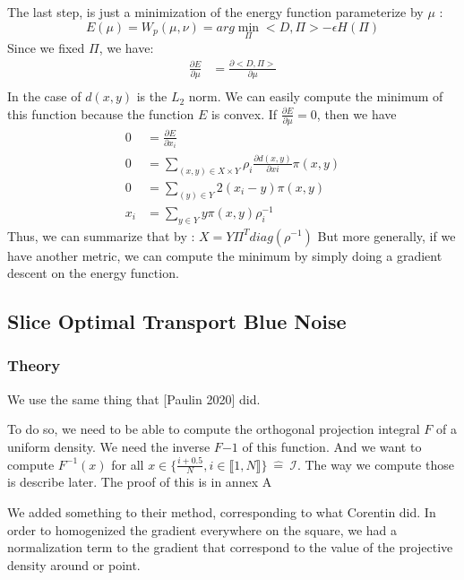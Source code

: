 \documentclass{classeENS}
\begin{document}
The last step, is just a minimization of the energy function parameterize by $\mu$ :
\[ E(\mu) = W_p(\mu, \nu) = arg \min_{\Pi} <D,\Pi> - \epsilon H(\Pi) \]
Since we fixed $\Pi$, we have:
\begin{align*}
    \frac{\partial E}{\partial \mu} &= \frac{\partial <D,\Pi>}{\partial \mu} \\
\end{align*}
In the case of $d(x,y)$ is the $L_2$ norm. We can easily compute the minimum of this function 
because the function $E$ is convex. If $\frac{\partial E}{\partial \mu} = 0$, then we have
\begin{align*}
    0 &= \frac{\partial E}{\partial x_i}\\
    0 &= \sum_{(x,y)\in X\times Y} \rho_i \frac{\partial d(x,y)}{\partial xi}\pi(x,y) \\
    0 &= \sum_{(y)\in Y} 2(x_i - y)\pi(x,y) \\
    x_i &= \sum_{y \in Y} y \pi(x,y) \rho_i^{-1}
\end{align*}
Thus, we can summarize that by : $X = Y \Pi^T diag(\rho^{-1})$
But more generally, if we have another metric, we can compute the minimum by simply doing a 
gradient descent on the energy function.

\subsection{Slice Optimal Transport Blue Noise }
    
\subsubsection{Theory}
    We use the same thing that [Paulin 2020] did.

    \> To do so, we need to be able to compute the orthogonal projection integral $F$
    of a uniform density. We need the inverse $F{-1}$ of this function. And we want to 
    compute
    $F^{-1}(x)$ for all $x \in \{\frac{i+0.5}{N}, i \in \llbracket 1,N \rrbracket\}\: 
        \widehat = \:\mathcal I$.
    The way we compute those is describe later. The proof of this is in annex A
    

    \> We added something to their method, corresponding to what Corentin did. In order to 
    homogenized the gradient everywhere on the square, we had a normalization term to the 
    gradient that correspond to the value of the projective density around or point.
\end{document}
